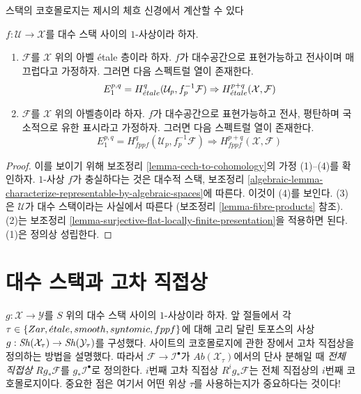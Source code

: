 \begin{proposition}
\label{proposition-smooth-covering-compute-cohomology}
\begin{slogan}
스택의 코호몰로지는 제시의 체흐 신경에서 계산할 수 있다
\end{slogan}
$f : \mathcal{U} \to \mathcal{X}$를 대수 스택 사이의
$1$-사상이라 하자.
\begin{enumerate}
\item $\mathcal{F}$를 $\mathcal{X}$ 위의 아벨 \'etale 층이라 하자.
$f$가 대수공간으로 표현가능하고 전사이며 매끄럽다고 가정하자.
그러면 다음 스펙트럴 열이 존재한다.
$$
E_1^{p, q} = H^q_{\acute{e}tale}(\mathcal{U}_p, f_p^{-1}\mathcal{F})
\Rightarrow
H^{p + q}_{\acute{e}tale}(\mathcal{X}, \mathcal{F})
$$
\item $\mathcal{F}$를 $\mathcal{X}$ 위의 아벨층이라 하자.
$f$가 대수공간으로 표현가능하고 전사, 평탄하며 국소적으로
유한 표시라고 가정하자. 그러면 다음 스펙트럴 열이 존재한다.
$$
E_1^{p, q} = H^q_{fppf}(\mathcal{U}_p, f_p^{-1}\mathcal{F})
\Rightarrow
H^{p + q}_{fppf}(\mathcal{X}, \mathcal{F})
$$
\end{enumerate}
\end{proposition}

\begin{proof}
이를 보이기 위해 보조정리 \ref{lemma-cech-to-cohomology}의
가정 (1)--(4)를 확인하자.
$1$-사상 $f$가 충실하다는 것은 대수적 스택, 보조정리
\ref{algebraic-lemma-characterize-representable-by-algebraic-spaces}에
따른다. 이것이 (4)를 보인다.
(3)은 $\mathcal{U}$가 대수 스택이라는 사실에서 따른다
(보조정리 \ref{lemma-fibre-products} 참조).
(2)는 보조정리 \ref{lemma-surjective-flat-locally-finite-presentation}을
적용하면 된다. (1)은 정의상 성립한다.
\end{proof}










\section{대수 스택과 고차 직접상}
\label{section-higher-direct-images}

\noindent
$g : \mathcal{X} \to \mathcal{Y}$를 $S$ 위의 대수 스택 사이의
$1$-사상이라 하자. 앞 절들에서 각
$\tau \in \{Zar, {\acute{e}tale}, smooth, syntomic, fppf\}$에 대해
고리 달린 토포스의 사상
$g : \mathop{\mathit{Sh}}\nolimits(\mathcal{X}_\tau) \to \mathop{\mathit{Sh}}\nolimits(\mathcal{Y}_\tau)$를 구성했다.
사이트의 코호몰로지에 관한 장에서 고차 직접상을 정의하는 방법을
설명했다. 따라서 $\mathcal{F} \to \mathcal{I}^\bullet$가
$\textit{Ab}(\mathcal{X}_\tau)$에서의 단사 분해일 때
{\it 전체 직접상} $Rg_*\mathcal{F}$를
$g_*\mathcal{I}^\bullet$로 정의한다. $i$번째 고차 직접상
$R^ig_*\mathcal{F}$는 전체 직접상의 $i$번째 코호몰로지이다.
중요한 점은 여기서 어떤 위상 $\tau$를 사용하는지가 중요하다는 것이다!

